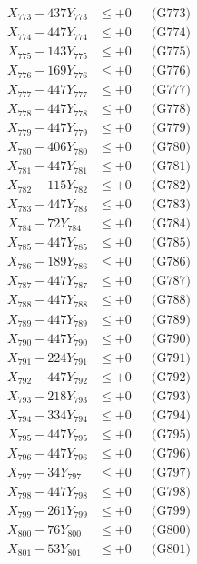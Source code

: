\documentclass[a4paper,10pt]{article}
\begin{document}
{\begin{align}
X_{773} - 437Y_{773} &\leq +0 && \text{(G773)} \\
X_{774} - 447Y_{774} &\leq +0 && \text{(G774)} \\
X_{775} - 143Y_{775} &\leq +0 && \text{(G775)} \\
X_{776} - 169Y_{776} &\leq +0 && \text{(G776)} \\
X_{777} - 447Y_{777} &\leq +0 && \text{(G777)} \\
X_{778} - 447Y_{778} &\leq +0 && \text{(G778)} \\
X_{779} - 447Y_{779} &\leq +0 && \text{(G779)} \\
X_{780} - 406Y_{780} &\leq +0 && \text{(G780)} \\
\allowbreak
X_{781} - 447Y_{781} &\leq +0 && \text{(G781)} \\
X_{782} - 115Y_{782} &\leq +0 && \text{(G782)} \\
X_{783} - 447Y_{783} &\leq +0 && \text{(G783)} \\
X_{784} - 72Y_{784} &\leq +0 && \text{(G784)} \\
X_{785} - 447Y_{785} &\leq +0 && \text{(G785)} \\
X_{786} - 189Y_{786} &\leq +0 && \text{(G786)} \\
X_{787} - 447Y_{787} &\leq +0 && \text{(G787)} \\
X_{788} - 447Y_{788} &\leq +0 && \text{(G788)} \\
X_{789} - 447Y_{789} &\leq +0 && \text{(G789)} \\
X_{790} - 447Y_{790} &\leq +0 && \text{(G790)} \\
\allowbreak
X_{791} - 224Y_{791} &\leq +0 && \text{(G791)} \\
X_{792} - 447Y_{792} &\leq +0 && \text{(G792)} \\
X_{793} - 218Y_{793} &\leq +0 && \text{(G793)} \\
X_{794} - 334Y_{794} &\leq +0 && \text{(G794)} \\
X_{795} - 447Y_{795} &\leq +0 && \text{(G795)} \\
X_{796} - 447Y_{796} &\leq +0 && \text{(G796)} \\
X_{797} - 34Y_{797} &\leq +0 && \text{(G797)} \\
X_{798} - 447Y_{798} &\leq +0 && \text{(G798)} \\
X_{799} - 261Y_{799} &\leq +0 && \text{(G799)} \\
X_{800} - 76Y_{800} &\leq +0 && \text{(G800)} \\
\allowbreak
X_{801} - 53Y_{801} &\leq +0 && \text{(G801)} \\

\end{align}}
\end{document}
